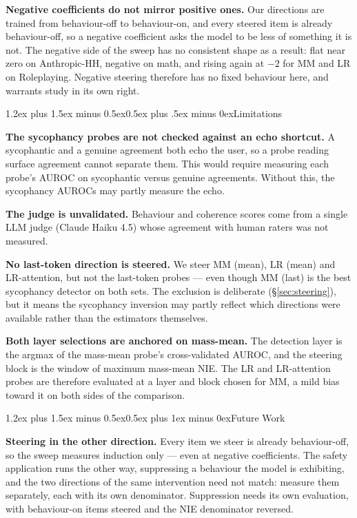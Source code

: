 \documentclass[conference]{IEEEtran}
\makeatletter
\renewcommand{\section}{\@startsection{section}{1}{\z@}%
  {1.2ex plus 1.5ex minus 0.5ex}{0.5ex plus 1ex minus 0ex}{\normalfont\normalsize\centering\scshape}}
\renewcommand{\subsection}{\@startsection{subsection}{2}{\z@}%
  {1.2ex plus 1.5ex minus 0.5ex}{0.5ex plus .5ex minus 0ex}{\normalfont\normalsize\itshape}}
\makeatother
\begin{document}
\textbf{Negative coefficients do not mirror positive ones.} Our directions
are trained from behaviour-off to behaviour-on, and every steered item is
already behaviour-off, so a negative coefficient asks the model to be less
of something it is not. The negative side of the sweep has no consistent
shape as a result: flat near zero on Anthropic-HH, negative on math, and
rising again at $-2$ for MM and LR on Roleplaying.
Negative steering therefore has no fixed behaviour here, and warrants
study in its own right.

\subsection{Limitations}

\textbf{The sycophancy probes are not checked against an echo shortcut.}
A sycophantic and a genuine agreement both echo the user, so a probe
reading surface agreement cannot separate them. This would require measuring each
probe's AUROC on sycophantic versus genuine agreements. Without this, the sycophancy AUROCs may partly measure the
echo.

\textbf{The judge is unvalidated.} Behaviour and coherence scores come from
a single LLM judge (Claude Haiku 4.5) whose agreement with human raters was
not measured.

\textbf{No last-token direction is steered.} We steer MM (mean), LR (mean)
and LR-attention, but not the last-token probes --- even though MM (last) is
the best sycophancy detector on both sets. The exclusion is deliberate
(\S\ref{sec:steering}), but it means the sycophancy inversion may partly
reflect which directions were available rather than the estimators themselves.

\textbf{Both layer selections are anchored on mass-mean.} The detection
layer is the argmax of the mass-mean probe's cross-validated AUROC, and the
steering block is the window of maximum mass-mean NIE. The LR
and LR-attention probes are therefore evaluated at a layer and block
chosen for MM, a mild bias toward it on both sides of the
comparison.

\section{Future Work}


\textbf{Steering in the other direction.} Every item we steer is already
behaviour-off, so the sweep measures induction only --- even at negative
coefficients. The safety application runs the other way, suppressing a
behaviour the model is exhibiting, and the two directions of the same
intervention need not match: \citet{marks2024} measure them separately,
each with its own denominator. Suppression needs its own evaluation, with
behaviour-on items steered and the NIE denominator reversed.
\end{document}
